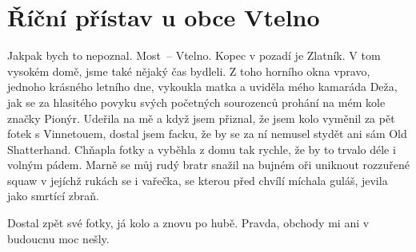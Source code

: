 
\chapter{Říční přístav u obce Vtelno}

Jakpak bych to nepoznal. Most~-- Vtelno. Kopec v pozadí je Zlatník. V
tom vysokém domě, jsme také nějaký čas bydleli. Z toho horního okna
vpravo, jednoho krásného letního dne, vykoukla matka a uviděla mého
kamaráda Deža, jak se za hlasitého povyku svých početných sourozenců
prohání na mém kole značky Pionýr. Udeřila na mě a když jsem přiznal,
že jsem kolo vyměnil za pět fotek s Vinnetouem, dostal jsem facku, že
by se za ní nemusel stydět ani sám Old Shatterhand. Chňapla fotky a
vyběhla z domu tak rychle, že by to trvalo déle i volným pádem. Marně
se můj rudý bratr snažil na bujném oři uniknout rozzuřené squaw v
jejíchž rukách se i vařečka, se kterou před chvílí míchala guláš,
jevila jako smrtící zbraň.

Dostal zpět své fotky, já kolo a znovu po hubě. Pravda, obchody mi ani
v budoucnu moc nešly.

